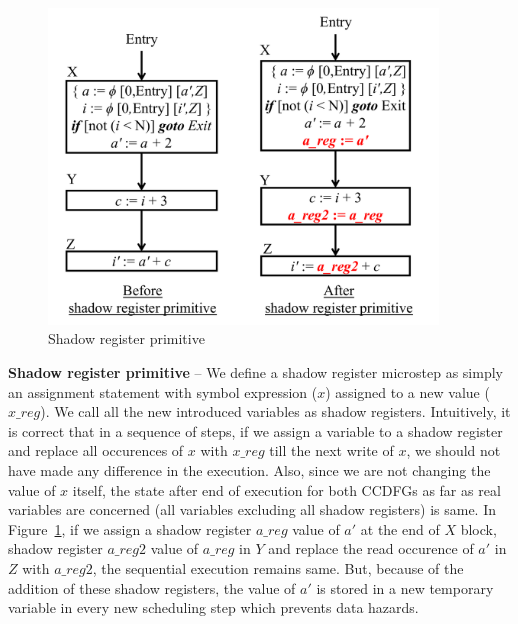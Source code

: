 \begin{figure}[t!]
\begin{center}
\includegraphics[height=3.3in]{fig-proposal/shadow-reg-primitive}
\end{center}
\caption{Shadow register primitive}
\label{fig:primitives1}
\end{figure}

{\textbf {Shadow register primitive}} -- We define a shadow register microstep as simply an assignment
statement with symbol expression ($x$) assigned to a new value ($x\_reg$). We call all the new introduced variables as shadow registers. Intuitively, it is correct that in a
sequence of steps, if we assign a variable to a shadow register and replace all occurences of $x$ with $x\_reg$
till the next write of $x$, we should
not have made any difference in the execution. Also, since we are not changing the value of $x$ itself,
 the state after end of execution for both CCDFGs as far as real variables are concerned (all variables
 excluding all shadow registers) is same. In Figure~\ref{fig:primitives1}, if we assign a shadow register
 $a\_reg$ value of $a'$ at the end of $X$ block, shadow register $a\_reg2$ value of $a\_reg$ in $Y$ and replace the read occurence of $a'$ in $Z$ with $a\_reg2$, the sequential execution remains same.
But, because of the addition of these shadow registers, the value of $a'$ is stored in a new temporary variable in every new scheduling step which prevents data hazards.

